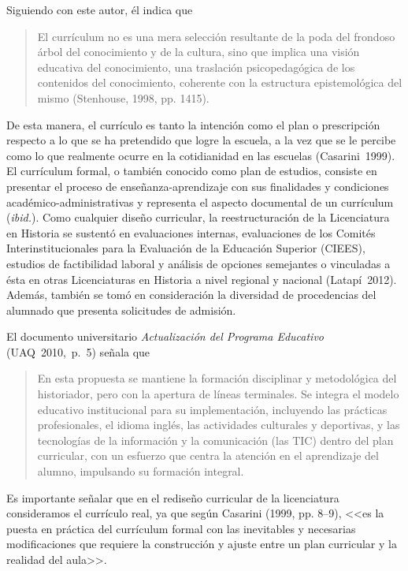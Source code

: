 Siguiendo con este autor, él indica que
\enlargethispage{-1\baselineskip}

\begin{quotation}
El currículum no es una mera selección resultante de la poda del frondoso árbol del conocimiento y de la cultura, sino que implica una visión educativa del conocimiento, una traslación psicopedagógica de los contenidos del conocimiento, coherente con la estructura epistemológica del mismo (Stenhouse, 1998, pp. 14\textendash{}15). 
\end{quotation}

De esta manera, el currículo es tanto la intención como el plan o 
prescripción respecto a lo que se ha pretendido que logre la escuela, a 
la vez que se le percibe como lo que realmente ocurre en la 
cotidianidad en las escuelas (Casarini~1999). El currículum formal, o 
también conocido como plan de estudios, consiste en presentar el 
proceso de enseñanza-aprendizaje con sus finalidades y condiciones 
académico-administrativas y representa el aspecto documental de un 
currículum (\textit{ibid.}). Como cualquier diseño curricular, la 
reestructuración de la Licenciatura en Historia se sustentó en 
evaluaciones internas,  evaluaciones de los Comités 
Interinstitucionales para la Evaluación de la Educación Superior 
(CIEES), estudios de factibilidad laboral y análisis de opciones 
semejantes o vinculadas a ésta en otras Licenciaturas en Historia a 
nivel regional y nacional (Latapí~2012).  Además, también se tomó en 
consideración la diversidad de procedencias del alumnado que presenta 
solicitudes de admisión. 

El documento universitario {\itshape Ac\-tua\-li\-za\-ción del Pro\-gra\-ma 
Edu\-ca\-ti\-vo\/}\\ \mbox{(UAQ~2010,~p.~5)} se\-ña\-la que

\begin{quotation}
En esta propuesta se mantiene la formación disciplinar y metodológica del historiador, 
pero con la apertura de líneas terminales. Se integra el modelo educativo institucional 
para su implementación, incluyendo las prácticas  profesionales, el idioma inglés, las actividades culturales y deportivas, y las tecnologías de la información y la comunicación (las TIC) dentro del plan curricular, con un esfuerzo que centra la atención en el aprendizaje del alumno, impulsando su formación integral.
\end{quotation}

\enlargethispage{1\baselineskip}
Es importante señalar que en el rediseño curricular de la licenciatura consideramos 
el currículo real,  ya que según Casarini (1999, pp. 8--9),  <<es la puesta en práctica 
del currículum formal con las inevitables y necesarias modificaciones que requiere la construcción y ajuste entre un plan curricular y la realidad del aula>>. 

